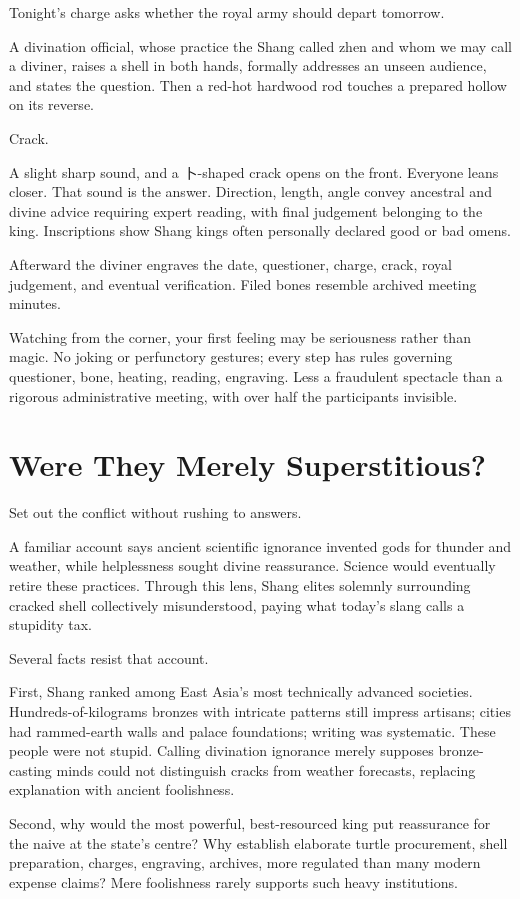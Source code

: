Tonight's charge asks whether the royal army should depart tomorrow.

A divination official, whose practice the Shang called zhen and whom we may call a diviner, raises a shell in both hands, formally addresses an unseen audience, and states the question. Then a red-hot hardwood rod touches a prepared hollow on its reverse.

Crack.

A slight sharp sound, and a \mbox{卜}-shaped crack opens on the front. Everyone leans closer. That sound is the answer. Direction, length, angle convey ancestral and divine advice requiring expert reading, with final judgement belonging to the king. Inscriptions show Shang kings often personally declared good or bad omens.

Afterward the diviner engraves the date, questioner, charge, crack, royal judgement, and eventual verification. Filed bones resemble archived meeting minutes.

Watching from the corner, your first feeling may be seriousness rather than magic. No joking or perfunctory gestures; every step has rules governing questioner, bone, heating, reading, engraving. Less a fraudulent spectacle than a rigorous administrative meeting, with over half the participants invisible.

\section{Were They Merely Superstitious?}
Set out the conflict without rushing to answers.

A familiar account says ancient scientific ignorance invented gods for thunder and weather, while helplessness sought divine reassurance. Science would eventually retire these practices. Through this lens, Shang elites solemnly surrounding cracked shell collectively misunderstood, paying what today's slang calls a stupidity tax.

Several facts resist that account.

First, Shang ranked among East Asia's most technically advanced societies. Hundreds-of-kilograms bronzes with intricate patterns still impress artisans; cities had rammed-earth walls and palace foundations; writing was systematic. These people were not stupid. Calling divination ignorance merely supposes bronze-casting minds could not distinguish cracks from weather forecasts, replacing explanation with ancient foolishness.

Second, why would the most powerful, best-resourced king put reassurance for the naive at the state's centre? Why establish elaborate turtle procurement, shell preparation, charges, engraving, archives, more regulated than many modern expense claims? Mere foolishness rarely supports such heavy institutions.

